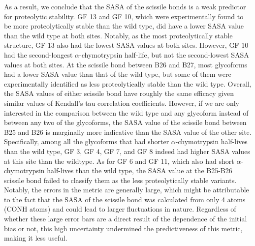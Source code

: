 \documentclass[sn-vancouver]{sn-jnl}
\begin{document}
As a result, we conclude that the SASA of the scissile bonds is a weak predictor for proteolytic stability. GF 13 and GF 10, which were experimentally found to be more proteolytically stable than the wild type, did have a lower SASA value than the wild type at both sites. Notably, as the most proteolytically stable structure, GF 13 also had the lowest SASA values at both sites. However, GF 10 had the second-longest $\alpha$-chymotrypsin half-life, but not the second-lowest SASA values at both sites. At the scissile bond between B26 and B27, most glycoforms had a lower SASA value than that of the wild type, but some of them were experimentally identified as less proteolytically stable than the wild type. Overall, the SASA values of either scissile bond have roughly the same efficacy given similar values of Kendall’s tau correlation coefficients. However, if we are only interested in the comparison between the wild type and any glycoform instead of between any two of the glycoforms, the SASA value of the scissile bond between B25 and B26 is marginally more indicative than the SASA value of the other site. Specifically, among all the glycoforms that had shorter $\alpha$-chymotrypsin half-lives than the wild type, GF 3, GF 4, GF 7, and GF 8 indeed had higher SASA values at this site than the wildtype. As for GF 6 and GF 11, which also had short $\alpha$-chymotrypsin half-lives than the wild type, the SASA value at the B25-B26 scissile bond failed to classify them as the less proteolytically stable variants. Notably, the errors in the metric are generally large, which might be attributable to the fact that the SASA of the scissile bond was calculated from only 4 atoms (CONH atoms) and could lead to larger fluctuations in nature. Regardless of whether these large error bars are a direct result of the dependence of the initial bias or not, this high uncertainty undermined the predictiveness of this metric, making it less useful.
\end{document}
